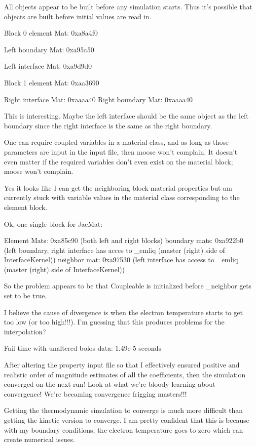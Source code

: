 {All objects appear to be built before any simulation starts. Thus it's possible that objects are built before initial values are read in.

Block 0 element Mat: 0xa8a4f0

Left boundary Mat: 0xa95a50

Left interface Mat: 0xa9d9d0


Block 1 element Mat: 0xaa3690

Right interface Mat: 0xaaaa40
Right boundary Mat: 0xaaaa40

This is interesting. Maybe the left interface should be the same object as the left boundary since the right interface is the same as the right boundary.

One can require coupled variables in a material class, and as long as those parameters are input in the input file, then moose won't complain. It doesn't even matter if the required variables don't even exist on the material block; moose won't complain.

Yes it looks like I can get the neighboring block material properties but am currently stuck with variable values in the material class corresponding to the element block.

Ok, one single block for JacMat:

Element Mats: 0xa85c90 (both left and right blocks)
boundary mats: 0xa922b0 (left boundary, right interface has acces to _emliq (master (right) side of InterfaceKernel))
neighbor mat: 0xa97530 (left interface has access to _emliq (master (right) side of InterfaceKernel))

So the problem appears to be that Coupleable is initialized before _neighbor gets set to be true.

I believe the cause of divergence is when the electron temperature starts to get too low (or too high!!!). I'm guessing that this produces problems for the interpolation?

Fail time with unaltered bolos data: 1.49e-5 seconds

After altering the property input file so that I effectively ensured positive and realistic order of magnitude estimates of all the coefficients, then the simulation converged on the next run! Look at what we're bloody learning about convergence! We're becoming convergence frigging masters!!!

Getting the thermodynamic simulation to converge is much more difficult than getting the kinetic version to converge. I am pretty confident that this is because with my boundary conditions, the electron temperature goes to zero which can create numerical issues.

}
